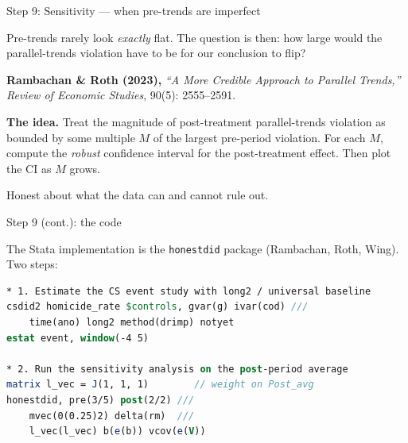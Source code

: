 \documentclass[aspectratio=169,12pt,t]{beamer}
\begin{document}
\begin{frame}{Step 9: Sensitivity --- when pre-trends are imperfect}
\vspace{0.4cm}

Pre-trends rarely look \textit{exactly} flat. \;The question is then: \;how large would the parallel-trends violation have to be for our conclusion to flip?

\vspace{0.4cm}

\textbf{Rambachan \& Roth (2023),} \;\textit{``A More Credible Approach to Parallel Trends,''} \;\textit{Review of Economic Studies}, 90(5): 2555--2591.

\vspace{0.4cm}

\textbf{The idea.} \;Treat the magnitude of post-treatment parallel-trends violation as bounded by some multiple $M$ of the largest pre-period violation. \;For each $M$, compute the \textit{robust} confidence interval for the post-treatment effect. \;Then plot the CI as $M$ grows.

\vspace{0.4em}
 \;Honest about what the data can and cannot rule out.
\end{frame}

\begin{frame}[fragile]{Step 9 (cont.): the code}
\vspace{0.15cm}

The Stata implementation is the \texttt{honestdid} package (Rambachan, Roth, Wing). \;Two steps:

\begin{lstlisting}[language=Stata]
* 1. Estimate the CS event study with long2 / universal baseline
csdid2 homicide_rate $controls, gvar(g) ivar(cod) ///
    time(ano) long2 method(drimp) notyet
estat event, window(-4 5)

* 2. Run the sensitivity analysis on the post-period average
matrix l_vec = J(1, 1, 1)        // weight on Post_avg
honestdid, pre(3/5) post(2/2) ///
    mvec(0(0.25)2) delta(rm)  ///
    l_vec(l_vec) b(e(b)) vcov(e(V))
\end{lstlisting}

\vspace{0.2em}
\end{frame}
\end{document}
